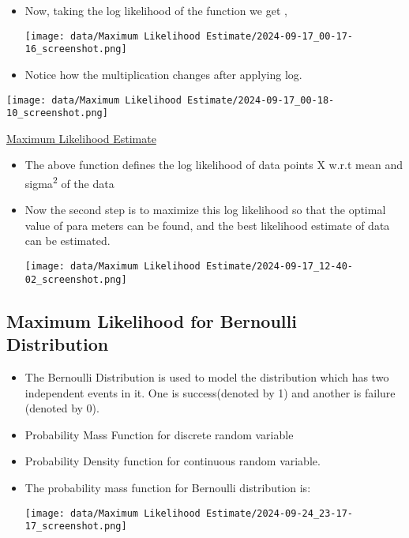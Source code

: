 \documentclass[11pt]{article}
\begin{document}
\begin{itemize}
\item Now, taking the log likelihood of the function we get ,
\begin{center}
\texttt{[image: data/Maximum Likelihood Estimate/2024-09-17\_00-17-16\_screenshot.png]}
\end{center}
\item Notice how the multiplication changes after applying log.
\end{itemize}

\begin{center}
\texttt{[image: data/Maximum Likelihood Estimate/2024-09-17\_00-18-10\_screenshot.png]}
\end{center}
\href{Maximum Likelihood Estimate.org}{Maximum Likelihood Estimate}

\begin{itemize}
\item The above function defines the log likelihood of data points X w.r.t mean and sigma\textsuperscript{2} of
the data

\item Now the second step is to maximize this log likelihood so that the optimal value of para
meters can be found, and the best likelihood estimate of data can be estimated.
\begin{center}
\texttt{[image: data/Maximum Likelihood Estimate/2024-09-17\_12-40-02\_screenshot.png]}
\end{center}
\end{itemize}


\subsection{Maximum Likelihood for Bernoulli Distribution}
\label{sec:orgf623c52}

\begin{itemize}
\item The Bernoulli Distribution is used to model the distribution which has two independent
events in it. One is success(denoted by 1) and another is failure (denoted by 0).

\item Probability Mass Function for discrete random variable
\item Probability Density function for continuous random variable.
\end{itemize}


\begin{itemize}
\item The probability mass  function for Bernoulli distribution is:

\begin{center}
\texttt{[image: data/Maximum Likelihood Estimate/2024-09-24\_23-17-17\_screenshot.png]}
\end{center}
\end{itemize}
\end{document}
